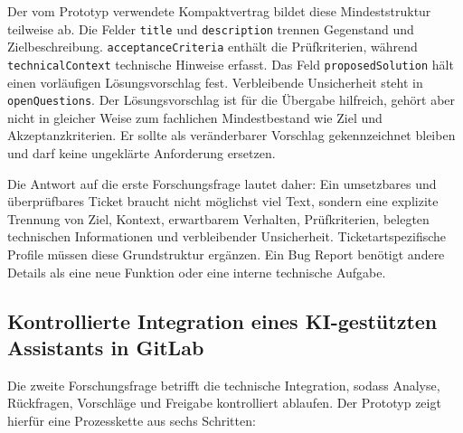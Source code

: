 Der vom Prototyp verwendete Kompaktvertrag bildet diese Mindeststruktur teilweise ab. Die Felder \texttt{title} und \texttt{description} trennen Gegenstand und Zielbeschreibung. \texttt{acceptanceCriteria} enthält die Prüfkriterien, während \texttt{technicalContext} technische Hinweise erfasst. Das Feld \texttt{proposedSolution} hält einen vorläufigen Lösungsvorschlag fest. Verbleibende Unsicherheit steht in \texttt{openQuestions}. Der Lösungsvorschlag ist für die Übergabe hilfreich, gehört aber nicht in gleicher Weise zum fachlichen Mindestbestand wie Ziel und Akzeptanzkriterien. Er sollte als veränderbarer Vorschlag gekennzeichnet bleiben und darf keine ungeklärte Anforderung ersetzen.

Die Antwort auf die erste Forschungsfrage lautet daher: Ein umsetzbares und überprüfbares Ticket braucht nicht möglichst viel Text, sondern eine explizite Trennung von Ziel, Kontext, erwartbarem Verhalten, Prüfkriterien, belegten technischen Informationen und verbleibender Unsicherheit. Ticketartspezifische Profile müssen diese Grundstruktur ergänzen. Ein Bug Report benötigt andere Details als eine neue Funktion oder eine interne technische Aufgabe.

\subsection{Kontrollierte Integration eines KI-gestützten Assistants in GitLab}

Die zweite Forschungsfrage betrifft die technische Integration, sodass Analyse, Rückfragen, Vorschläge und Freigabe kontrolliert ablaufen. Der Prototyp zeigt hierfür eine Prozesskette aus sechs Schritten:

